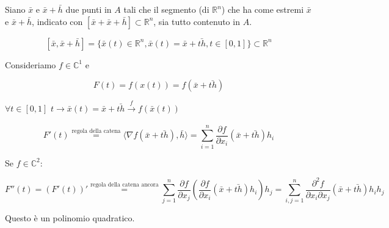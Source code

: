 \documentclass[../appunti-analisi.tex]{subfiles}
\begin{document}
Siano $\bar{x}$ e $\bar{x} +\bar{h} $ due punti in $A$ tali che il segmento (di $\mathbb{R}^{n}$) che ha come estremi $\bar{x} $ e $\bar{x} + \bar{h} $, indicato con $[\bar{x} +\bar{x} +\bar{h} ] \subset \mathbb{R}^{n}$, sia tutto contenuto in $A$.

       \[
           [\bar{x} , \bar{x} +\bar{h} ] = \{\bar{x} (t) \in \mathbb{R}^{n}, \bar{x} (t) = \bar{x} +\bar{th}, t \in [0,1]\} \subset \mathbb{R}^{n}
       \]

       Consideriamo $f \in \mathbb{C}^{1}$ e 

       \[
           F(t) = f(x(t)) = f(\bar{x} +\bar{th} ) 
       \]

       $\forall t \in [0,1]$ $t \rightarrow  \bar{x} (t) = \bar{x} + \bar{th} \xrightarrow[]{\text{$f$}}f(\bar{x} (t))$

       \[
           F'(t) \overset{\text{regola della catena}}{=} \langle \nabla f(\bar{x} +\bar{th} ),\bar{h}  \rangle = \sum^{n}_{i=1} \frac{\partial f}{\partial x_i} (\bar{x} +\bar{th} ) h_i
       \]

       Se $f \in  \mathbb{C}^{2}$:

       \[
           F''(t) = (F'(t))' \overset{\text{regola della catena ancora}}{=} \sum^{n}_{j=1} \frac{\partial f}{\partial x_j} ( \frac{\partial f}{\partial x_i}(\bar{x} +\bar{th} ) h_i) h_j = \sum^{n}_{i,j=1} \frac{\partial^{2} f}{\partial x_i \partial x_j} (\bar{x} + \bar{th} ) h_i h_j
       \]

       Questo è un polinomio quadratico.
\end{document}
